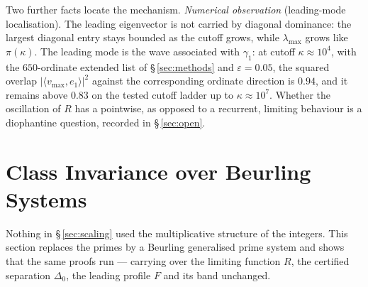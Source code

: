\documentclass[11pt]{article}
\begin{document}
Two further facts locate the mechanism. \emph{Numerical observation}
(leading-mode localisation). The leading eigenvector is not carried by
diagonal dominance: the largest diagonal entry stays bounded as the cutoff
grows, while $\lambda_{\max}$ grows like $\pi(\kappa)$. The leading mode is
the wave associated with $\gamma_1$: at cutoff $\kappa\approx10^{4}$, with
the $650$-ordinate extended list of \S\,\ref{sec:methods} and
$\varepsilon=0.05$, the squared overlap $|\langle v_{\max},e_1\rangle|^{2}$
against the corresponding ordinate direction is $0.94$, and it remains above
$0.83$ on the tested cutoff ladder up to $\kappa\approx10^{7}$. Whether the oscillation of $R$ has a
pointwise, as opposed to a recurrent, limiting behaviour is a diophantine
question, recorded in \S\,\ref{sec:open}.

\section{Class Invariance over Beurling Systems}
\label{sec:class}

Nothing in \S\,\ref{sec:scaling} used the multiplicative structure of the
integers. This section replaces the primes by a Beurling generalised prime
system and shows that the same proofs run --- carrying over the limiting
function $R$, the certified separation $\Delta_0$, the leading profile $F$ and
its band unchanged.
\end{document}
